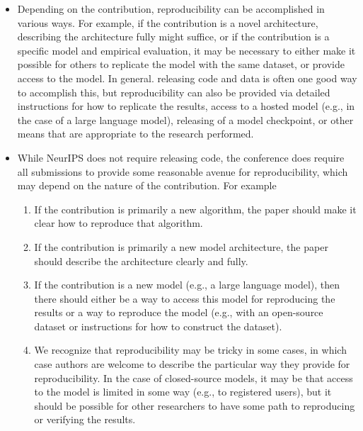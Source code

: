 \begin{enumerate}
\begin{itemize}
        \item Depending on the contribution, reproducibility can be accomplished in various ways. For example, if the contribution is a novel architecture, describing the architecture fully might suffice, or if the contribution is a specific model and empirical evaluation, it may be necessary to either make it possible for others to replicate the model with the same dataset, or provide access to the model. In general. releasing code and data is often one good way to accomplish this, but reproducibility can also be provided via detailed instructions for how to replicate the results, access to a hosted model (e.g., in the case of a large language model), releasing of a model checkpoint, or other means that are appropriate to the research performed.
        \item While NeurIPS does not require releasing code, the conference does require all submissions to provide some reasonable avenue for reproducibility, which may depend on the nature of the contribution. For example
        \begin{enumerate}
            \item If the contribution is primarily a new algorithm, the paper should make it clear how to reproduce that algorithm.
            \item If the contribution is primarily a new model architecture, the paper should describe the architecture clearly and fully.
            \item If the contribution is a new model (e.g., a large language model), then there should either be a way to access this model for reproducing the results or a way to reproduce the model (e.g., with an open-source dataset or instructions for how to construct the dataset).
            \item We recognize that reproducibility may be tricky in some cases, in which case authors are welcome to describe the particular way they provide for reproducibility. In the case of closed-source models, it may be that access to the model is limited in some way (e.g., to registered users), but it should be possible for other researchers to have some path to reproducing or verifying the results.
        \end{enumerate}
    \end{itemize}



\end{enumerate}
